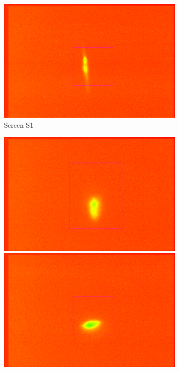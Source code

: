 \documentclass[11pt,a4paper,notitlepage]{scrartcl}
\begin{document}
\begin{figure}[htbp]
\begin{subfigure}{0.19\linewidth}
		\includegraphics[width=\linewidth]{figs/Screens/S1_Calib.png}
	\caption{Screen S1}\label{fig:ScreenS1}
	\end{subfigure}	\hfill
	\begin{subfigure}{0.19\linewidth}
		\includegraphics[width=\linewidth]{figs/Screens/S2_Eyeball.png}
		\includegraphics[width=\linewidth]{figs/Screens/S2_Calib.png}

\end{subfigure}
\end{figure}
\end{document}
